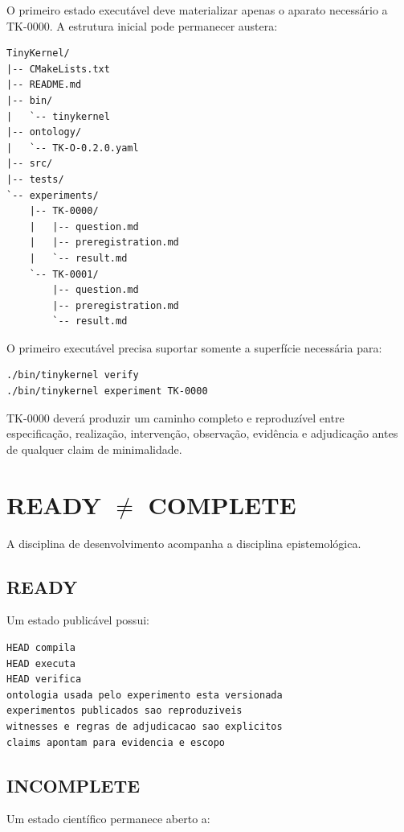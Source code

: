 \documentclass[11pt,a4paper]{article}
\begin{document}
O primeiro estado executável deve materializar apenas o aparato necessário a TK-0000.
A estrutura inicial pode permanecer austera:

\begin{lstlisting}
TinyKernel/
|-- CMakeLists.txt
|-- README.md
|-- bin/
|   `-- tinykernel
|-- ontology/
|   `-- TK-O-0.2.0.yaml
|-- src/
|-- tests/
`-- experiments/
    |-- TK-0000/
    |   |-- question.md
    |   |-- preregistration.md
    |   `-- result.md
    `-- TK-0001/
        |-- question.md
        |-- preregistration.md
        `-- result.md
\end{lstlisting}

O primeiro executável precisa suportar somente a superfície necessária para:

\begin{lstlisting}
./bin/tinykernel verify
./bin/tinykernel experiment TK-0000
\end{lstlisting}

TK-0000 deverá produzir um caminho completo e reproduzível entre especificação,
realização, intervenção, observação, evidência e adjudicação antes de qualquer claim
de minimalidade.

\section{\texorpdfstring{READY $\neq$ COMPLETE}{READY != COMPLETE}}

A disciplina de desenvolvimento acompanha a disciplina epistemológica.

\subsection{READY}

Um estado publicável possui:

\begin{lstlisting}
HEAD compila
HEAD executa
HEAD verifica
ontologia usada pelo experimento esta versionada
experimentos publicados sao reproduziveis
witnesses e regras de adjudicacao sao explicitos
claims apontam para evidencia e escopo
\end{lstlisting}

\subsection{INCOMPLETE}

Um estado científico permanece aberto a:
\end{document}
